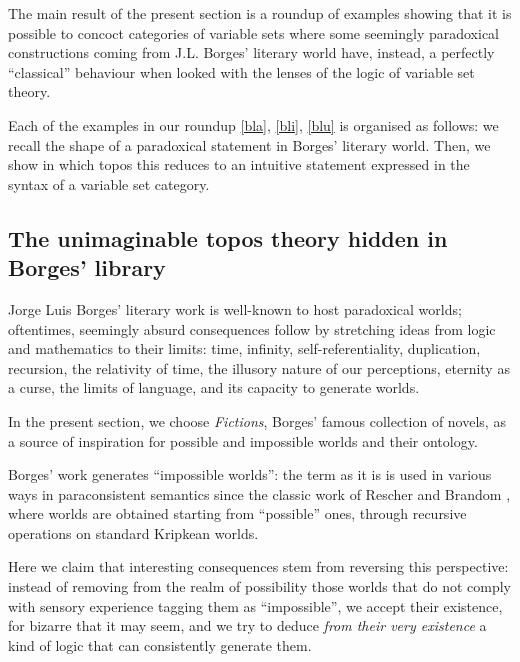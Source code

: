 The main result of the present section is a roundup of examples showing that it is possible to concoct categories of variable sets where some seemingly paradoxical constructions coming from J.L. Borges' literary world have, instead, a perfectly ``classical'' behaviour when looked with the lenses of the logic of variable set theory.

Each of the examples in our roundup \autoref{bla}, \ref{bli}, \ref{blu} is organised as follows: we recall the shape of a paradoxical statement in Borges' literary world. Then, we show in which topos this reduces to an intuitive statement expressed in the syntax of a variable set category.

\subsection{The unimaginable topos theory hidden in Borges' library}
Jorge Luis Borges' literary work is well-known to host paradoxical worlds; oftentimes, seemingly absurd consequences follow by stretching ideas from logic and mathematics to their limits: time, infinity, self-referentiality, duplication, recursion, the relativity of time, the illusory nature of our perceptions, eternity as a curse, the limits of language, and its capacity to generate worlds.

In the present section, we choose \emph{Fictions}, Borges' famous collection of novels, as a source of inspiration for possible and impossible worlds and their ontology.

Borges' work generates ``impossible worlds'': the term as it is is used in various ways in paraconsistent semantics since the classic work of Rescher and Brandom \cite{10.2307/20127724}, where worlds are obtained starting from ``possible'' ones, through recursive operations on standard Kripkean worlds.

Here we claim that interesting consequences stem from reversing this perspective: instead of removing from the realm of possibility those worlds that do not comply with sensory experience tagging them as ``impossible'', we accept their existence, for bizarre that it may seem, and we try to deduce \emph{from their very existence} a kind of logic that can consistently generate them.

